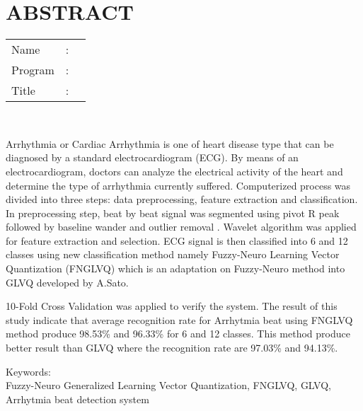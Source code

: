 %
%
%

\chapter*{ABSTRACT}

\vspace*{0.2cm}

\noindent \begin{tabular}{l l p{11.0cm}}
	Name&: & \penulis \\
	Program&: & \programstudi \\
	Title&: & \judulInggris \\
\end{tabular} \\ 

\vspace*{0.5cm}

\noindent
Arrhythmia or Cardiac Arrhythmia is one of heart
disease type that can be diagnosed by a standard electrocardiogram (ECG). By
means of an electrocardiogram, doctors can analyze the electrical activity of
the heart and determine the type of arrhythmia currently suffered. Computerized
process was divided into three steps: data preprocessing, feature extraction and
classification. In preprocessing step, beat by beat signal was segmented using
pivot R peak followed by baseline wander and outlier removal . Wavelet algorithm
was applied for feature extraction and selection. ECG signal is then classified
into 6 and 12 classes using new classification method namely  Fuzzy-Neuro
Learning Vector Quantization (FNGLVQ) which is an adaptation on Fuzzy-Neuro
method into GLVQ developed by A.Sato.

10-Fold Cross Validation was applied to verify the system. The result of this
study indicate that average recognition rate for Arrhytmia beat using
FNGLVQ method produce 98.53\% and 96.33\% for 6 and 12 classes. This method
produce better result than GLVQ where the recognition rate are 97.03\% and
94.13\%.
\\


\vspace*{0.2cm}

\noindent Keywords: \\ 
\noindent Fuzzy-Neuro Generalized Learning Vector Quantization, FNGLVQ,
GLVQ, Arrhytmia beat detection system\\

\newpage